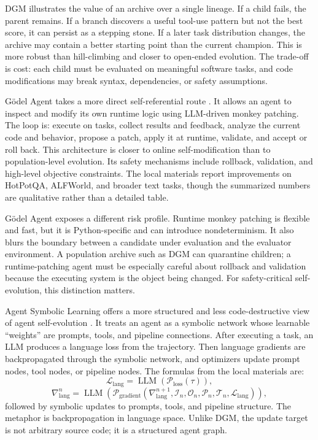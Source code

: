 DGM illustrates the value of an archive over a single lineage.  If a child fails, the parent remains.  If a branch discovers a useful tool-use pattern but not the best score, it can persist as a stepping stone.  If a later task distribution changes, the archive may contain a better starting point than the current champion.  This is more robust than hill-climbing and closer to open-ended evolution.  The trade-off is cost: each child must be evaluated on meaningful software tasks, and code modifications may break syntax, dependencies, or safety assumptions.

G{\"o}del Agent takes a more direct self-referential route \cite{yin2024godel}.  It allows an agent to inspect and modify its own runtime logic using LLM-driven monkey patching.  The loop is: execute on tasks, collect results and feedback, analyze the current code and behavior, propose a patch, apply it at runtime, validate, and accept or roll back.  This architecture is closer to online self-modification than to population-level evolution.  Its safety mechanisms include rollback, validation, and high-level objective constraints.  The local materials report improvements on HotPotQA, ALFWorld, and broader text tasks, though the summarized numbers are qualitative rather than a detailed table.

G{\"o}del Agent exposes a different risk profile.  Runtime monkey patching is flexible and fast, but it is Python-specific and can introduce nondeterminism.  It also blurs the boundary between a candidate under evaluation and the evaluator environment.  A population archive such as DGM can quarantine children; a runtime-patching agent must be especially careful about rollback and validation because the executing system is the object being changed.  For safety-critical self-evolution, this distinction matters.

Agent Symbolic Learning offers a more structured and less code-destructive view of agent self-evolution \cite{agentsymboliclearning2024}.  It treats an agent as a symbolic network whose learnable ``weights'' are prompts, tools, and pipeline connections.  After executing a task, an LLM produces a language loss from the trajectory.  Then language gradients are backpropagated through the symbolic network, and optimizers update prompt nodes, tool nodes, or pipeline nodes.  The formulas from the local materials are:
\begin{equation}
  \mathcal{L}_{\mathrm{lang}} = \operatorname{LLM}(\mathcal{P}_{\mathrm{loss}}(\tau)),
\end{equation}
\begin{equation}
  \nabla^n_{\mathrm{lang}} = \operatorname{LLM}\left(\mathcal{P}_{\mathrm{gradient}}(\nabla^{n+1}_{\mathrm{lang}}, \mathcal{I}_n, \mathcal{O}_n, \mathcal{P}_n, \mathcal{T}_n, \mathcal{L}_{\mathrm{lang}})\right),
\end{equation}
followed by symbolic updates to prompts, tools, and pipeline structure.  The metaphor is backpropagation in language space.  Unlike DGM, the update target is not arbitrary source code; it is a structured agent graph.

